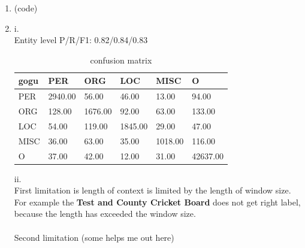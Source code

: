 \documentclass[10pt]{article}
\begin{document}
\begin{enumerate}[label=(\alph*)]
\item
(code)

\item
i.\\
Entity level P/R/F1: 0.82/0.84/0.83\\
\begin{table}[h]
	\centering
	\caption{confusion matrix}
	\begin{tabular}{|l|l|l|l|l|l|}
	\hline
	gogu & PER     & ORG     & LOC     & MISC    & O        \\ \hline
	PER   & 2940.00 & 56.00   & 46.00   & 13.00   & 94.00    \\ \hline
	ORG   & 128.00  & 1676.00 & 92.00   & 63.00   & 133.00   \\ \hline
	LOC   & 54.00   & 119.00  & 1845.00 & 29.00   & 47.00    \\ \hline
	MISC  & 36.00   & 63.00   & 35.00   & 1018.00 & 116.00   \\ \hline
	O     & 37.00   & 42.00   & 12.00   & 31.00   & 42637.00 \\ \hline
	\end{tabular}
\end{table}

ii.\\
First limitation is length of context is limited by the length of window size.
For example the \textbf{Test and County Cricket Board} does not get right label, because the length has exceeded the window size.\\
\\
Second limitation (some helps me out here)

\end{enumerate}
\end{document}
